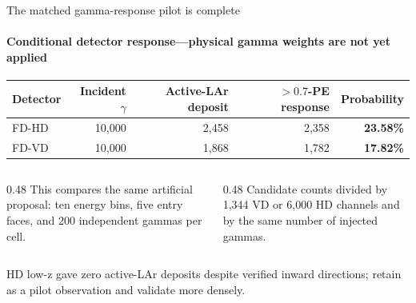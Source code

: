 \documentclass[aspectratio=169,11pt]{beamer}
\begin{document}
\begin{frame}{The matched gamma-response pilot is complete}
  \framesubtitle{Conditional detector response---physical gamma weights are not yet applied}
  \small
  \setlength{\tabcolsep}{5pt}
  \renewcommand{\arraystretch}{1.22}
  \begin{tabular}{@{}lrrrr@{}}
    \toprule
    Detector & Incident $\gamma$ & Active-LAr deposit & $>0.7$-PE response & Probability \\
    \midrule
    FD-HD & 10,000 & 2,458 & 2,358 & \textbf{23.58\%} \\
    FD-VD & 10,000 & 1,868 & 1,782 & \textbf{17.82\%} \\
    \bottomrule
  \end{tabular}

  \medskip
  \begin{columns}[T,onlytextwidth]
    \begin{column}{0.48\textwidth}
        {This compares the same artificial proposal: ten energy bins, five entry faces, and 200 independent gammas per cell.}
    \end{column}
    \begin{column}{0.48\textwidth}
        {Candidate counts divided by 1,344 VD or 6,000 HD channels and by the same number of injected gammas.}
    \end{column}
  \end{columns}

  \smallskip
  {\color{DuneTextMuted}\footnotesize HD low-z gave zero active-LAr deposits despite verified inward directions; retain as a pilot observation and validate more densely.}
\end{frame}
\end{document}
